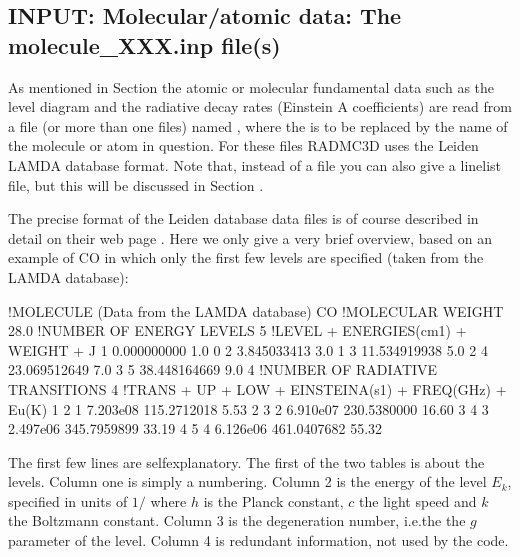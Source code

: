 \documentclass[letterpaper,10pt,english]{sphinxmanual}
\begin{document}
\subsection{INPUT: Molecular/atomic data: The molecule\_XXX.inp file(s)}
\label{\detokenize{lineradtrans:input-molecular-atomic-data-the-molecule-xxx-inp-file-s}}\label{\detokenize{lineradtrans:sec-leiden-format}}\label{\detokenize{lineradtrans:sec-molecule-xxx-inp}}
As mentioned in Section {\hyperref[\detokenize{lineradtrans:sec-line-dot-inp}]{}} the atomic or molecular
fundamental data such as the level diagram and the radiative decay rates
(Einstein A coefficients) are read from a file (or more than one files) named
, where the  is to be replaced by the name of the
molecule or atom in question. For these files RADMC\sphinxhyphen{}3D uses the Leiden LAMDA
database format. Note that, instead of a  file you can also
give a linelist file, but this will be discussed in Section
{\hyperref[\detokenize{lineradtrans:sec-linelist-xxx-inp}]{}}.

The precise format of the Leiden database data files is of course described
in detail on their web
page  . Here we only
give a very brief overview, based on an example of CO in which only the
first few levels are specified (taken from the LAMDA database):

\begin{sphinxVerbatim}[commandchars=\\\{\}]
!MOLECULE (Data from the LAMDA database)
CO
!MOLECULAR WEIGHT
28.0
!NUMBER OF ENERGY LEVELS
5
!LEVEL + ENERGIES(cm\PYGZca{}\PYGZhy{}1) + WEIGHT + J
    1     0.000000000  1.0     0
    2     3.845033413  3.0     1
    3    11.534919938  5.0     2
    4    23.069512649  7.0     3
    5    38.448164669  9.0     4
!NUMBER OF RADIATIVE TRANSITIONS
4
!TRANS + UP + LOW + EINSTEINA(s\PYGZca{}\PYGZhy{}1) + FREQ(GHz) + E\PYGZus{}u(K)
    1     2     1   7.203e\PYGZhy{}08     115.2712018      5.53
    2     3     2   6.910e\PYGZhy{}07     230.5380000     16.60
    3     4     3   2.497e\PYGZhy{}06     345.7959899     33.19
    4     5     4   6.126e\PYGZhy{}06     461.0407682     55.32
\end{sphinxVerbatim}

The first few lines are self\sphinxhyphen{}explanatory. The first of the two tables is about
the levels. Column one is simply a numbering. Column 2 is the energy of the
level \(E_k\), specified in units of \(1/\) where \(h\) is the Planck
constant, \(c\) the light speed and \(k\) the Boltzmann constant. Column
3 is the degeneration number, i.e.the the \(g\) parameter of the
level. Column 4 is redundant information, not used by the code.
\end{document}
